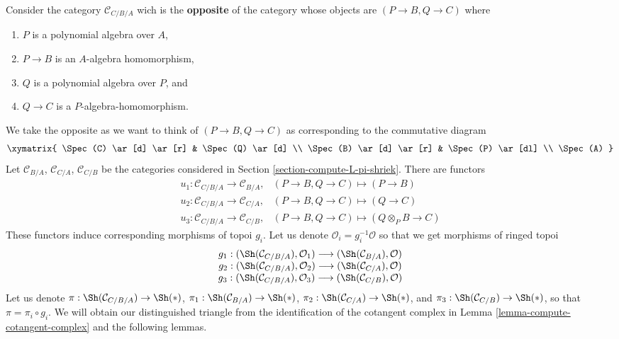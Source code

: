 \medskip\noindent
Consider the category $\mathcal{C}_{C/B/A}$
wich is the {\bf opposite} of the category whose objects are
$(P \to B, Q \to C)$ where
\begin{enumerate}
\item $P$ is a polynomial algebra over $A$,
\item $P \to B$ is an $A$-algebra homomorphism,
\item $Q$ is a polynomial algebra over $P$, and
\item $Q \to C$ is a $P$-algebra-homomorphism.
\end{enumerate}
We take the opposite as we want to think of $(P \to B, Q \to C)$
as corresponding to the commutative diagram
$$
\xymatrix{
\Spec(C) \ar[d] \ar[r] & \Spec(Q) \ar[d] \\
\Spec(B) \ar[d] \ar[r] & \Spec(P) \ar[dl] \\
\Spec(A)
}
$$
Let $\mathcal{C}_{B/A}$, $\mathcal{C}_{C/A}$, $\mathcal{C}_{C/B}$
be the categories considered in Section \ref{section-compute-L-pi-shriek}.
There are functors
$$
\begin{matrix}
u_1 : \mathcal{C}_{C/B/A} \to \mathcal{C}_{B/A}, &
(P \to B, Q \to C) \mapsto (P \to B) \\
u_2 : \mathcal{C}_{C/B/A} \to \mathcal{C}_{C/A}, &
(P \to B, Q \to C) \mapsto (Q \to C) \\
u_3 : \mathcal{C}_{C/B/A} \to \mathcal{C}_{C/B}, &
(P \to B, Q \to C) \mapsto (Q \otimes_P B \to C)
\end{matrix}
$$
These functors induce corresponding morphisms of topoi $g_i$.
Let us denote $\mathcal{O}_i = g_i^{-1}\mathcal{O}$ so that we
get morphisms of ringed topoi
\begin{equation}
\label{equation-three-maps}
\begin{matrix}
g_1 : (\Sh(\mathcal{C}_{C/B/A}), \mathcal{O}_1)
\longrightarrow (\Sh(\mathcal{C}_{B/A}), \mathcal{O}) \\
g_2 : (\Sh(\mathcal{C}_{C/B/A}), \mathcal{O}_2)
\longrightarrow (\Sh(\mathcal{C}_{C/A}), \mathcal{O}) \\
g_3 : (\Sh(\mathcal{C}_{C/B/A}), \mathcal{O}_3)
\longrightarrow (\Sh(\mathcal{C}_{C/B}), \mathcal{O})
\end{matrix}
\end{equation}
Let us denote
$\pi : \Sh(\mathcal{C}_{C/B/A}) \to \Sh(*)$,
$\pi_1 : \Sh(\mathcal{C}_{B/A}) \to \Sh(*)$,
$\pi_2 : \Sh(\mathcal{C}_{C/A}) \to \Sh(*)$, and
$\pi_3 : \Sh(\mathcal{C}_{C/B}) \to \Sh(*)$,
so that $\pi = \pi_i \circ g_i$.
We will obtain our distinguished triangle from the identification
of the cotangent complex in Lemma \ref{lemma-compute-cotangent-complex}
and the following lemmas.

